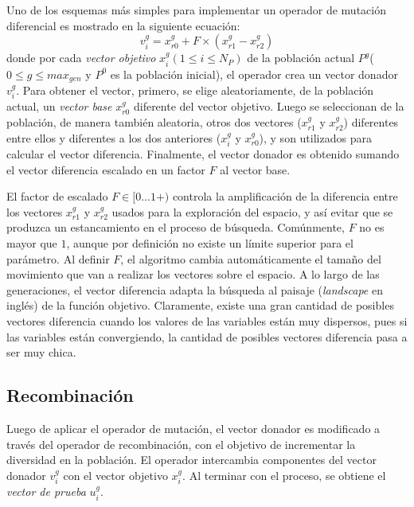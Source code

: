Uno de los esquemas más simples para implementar un operador de mutación
diferencial es mostrado en la siguiente ecuación:
\begin{equation}
v_i^g = x_{r0}^g + F \times (x_{r1}^g - x_{r2}^g)
\end{equation}
donde por cada \textit{vector objetivo} $x_i^g (1 \leq i \leq N_P)$ de la población actual $P^g$( $0 \leq g \leq max_{gen}$ y $P^0$ es la población inicial), el operador crea un vector donador $v_i^g$. Para obtener el vector, primero, se elige aleatoriamente, de la población actual, un \textit{vector base} $x_{r0}^g$ diferente del vector objetivo. Luego se seleccionan de la población, de manera también aleatoria, otros dos vectores ($x_{r1}^g$ y $x_{r2}^g$) diferentes entre ellos y diferentes a los dos anteriores ($x_{i}^g$ y $x_{r0}^g$), y son utilizados para calcular el vector diferencia. Finalmente, el vector donador es obtenido sumando el vector diferencia escalado en un factor $F$ al vector base.


El factor de escalado $F \in [0 . . . 1+)$ controla la amplificación de la diferencia entre los vectores $x_{r1}^g$ y $x_{r2}^g$ usados para la exploración del espacio, y así evitar que se produzca un estancamiento en el proceso de búsqueda. Comúnmente, $F$ no es mayor que $1$, aunque por definición no existe un límite superior para el parámetro. Al definir $F$, el algoritmo cambia automáticamente el tamaño del movimiento que van a realizar los vectores sobre el espacio. A lo largo de las generaciones, el vector diferencia adapta la búsqueda al paisaje (\textit{landscape} en inglés) de la función objetivo. Claramente, existe una gran cantidad de posibles vectores diferencia cuando los valores de las variables están muy dispersos, pues si las variables están convergiendo, la cantidad de posibles vectores diferencia pasa a ser muy chica.


\subsection{Recombinación}


Luego de aplicar el operador de mutación, el vector donador es modificado a través del operador de recombinación, con el objetivo de incrementar la diversidad en la población. El operador intercambia componentes del vector donador $v_i^g$ con el vector objetivo $x_i^g$. Al terminar con el proceso, se obtiene el \textit{vector de prueba} $u_i^g$.


